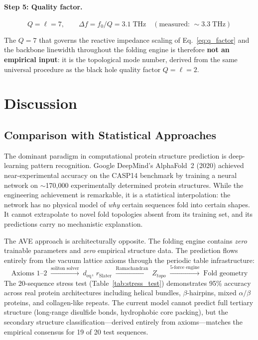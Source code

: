 \paragraph{Step 5: Quality factor.}
\begin{equation}
    Q = \ell = 7, \qquad \Delta f = f_0/Q = 3.1\;\text{THz} \quad (\text{measured: } {\sim}3.3\;\text{THz})
\end{equation}

\noindent The $Q = 7$ that governs the reactive impedance scaling of Eq.~\ref{eq:q_factor} and the backbone linewidth throughout the folding engine is therefore \textbf{not an empirical input}: it is the topological mode number, derived from the same universal procedure as the black hole quality factor $Q = \ell = 2$.


\section{Discussion}

\subsection{Comparison with Statistical Approaches}

The dominant paradigm in computational protein structure prediction is deep-learning pattern recognition. Google DeepMind's AlphaFold~2 (2020) achieved near-experimental accuracy on the CASP14 benchmark by training a neural network on $\sim$170{,}000 experimentally determined protein structures. While the engineering achievement is remarkable, it is a statistical interpolation: the network has no physical model of \emph{why} certain sequences fold into certain shapes. It cannot extrapolate to novel fold topologies absent from its training set, and its predictions carry no mechanistic explanation.

The AVE approach is architecturally opposite. The folding engine contains \emph{zero} trainable parameters and \emph{zero} empirical structure data. The prediction flows entirely from the vacuum lattice axioms through the periodic table infrastructure:
\[
    \text{Axioms 1--2} \;\xrightarrow{\text{soliton solver}}\; d_{\text{eq}},\, r_{\text{Slater}} \;\xrightarrow{\text{Ramachandran}}\; Z_{topo} \;\xrightarrow{\text{5-force engine}}\; \text{Fold geometry}
\]
The 20-sequence stress test (Table~\ref{tab:stress_test}) demonstrates 95\% accuracy across real protein architectures including helical bundles, $\beta$-hairpins, mixed $\alpha/\beta$ proteins, and collagen-like repeats. The current model cannot predict full tertiary structure (long-range disulfide bonds, hydrophobic core packing), but the secondary structure classification---derived entirely from axioms---matches the empirical consensus for 19 of 20 test sequences.

